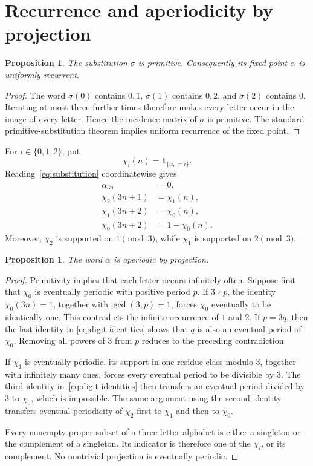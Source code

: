 \documentclass[11pt]{article}
\newtheorem{proposition}[theorem]{Proposition}
\newcommand{\one}{\mathbf 1}
\begin{document}
\section{Recurrence and aperiodicity by projection}\label{sec:dynamics}

\begin{proposition}\label{prop:recurrence}
The substitution $\sigma$ is primitive. Consequently its fixed point
$\alpha$ is uniformly recurrent.
\end{proposition}

\begin{proof}
The word $\sigma(0)$ contains $0,1$, $\sigma(1)$ contains $0,2$, and
$\sigma(2)$ contains $0$. Iterating at most three further times therefore
makes every letter occur in the image of every letter. Hence the incidence
matrix of $\sigma$ is primitive. The standard primitive-substitution theorem
\cite{Queffelec} implies uniform recurrence of the fixed point.
\end{proof}

For $i\in\{0,1,2\}$, put
\[
\chi_i(n)=\one_{\{\alpha_n=i\}}.
\]
Reading~\eqref{eq:substitution} coordinatewise gives
\begin{align}
\alpha_{3n}&=0,\nonumber\\
\chi_2(3n+1)&=\chi_1(n),\nonumber\\
\chi_1(3n+2)&=\chi_0(n),\nonumber\\
\chi_0(3n+2)&=1-\chi_0(n).
\label{eq:digit-identities}
\end{align}
Moreover, $\chi_2$ is supported on $1\pmod3$, while $\chi_1$ is supported on
$2\pmod3$.

\begin{proposition}\label{prop:projection}
The word $\alpha$ is aperiodic by projection.
\end{proposition}

\begin{proof}
Primitivity implies that each letter occurs infinitely often. Suppose first
that $\chi_0$ is eventually periodic with positive period $p$. If $3\nmid p$,
the identity $\chi_0(3n)=1$, together with $\gcd(3,p)=1$, forces $\chi_0$
eventually to be identically one. This contradicts the infinite occurrence of
$1$ and $2$. If $p=3q$, then the last identity in
\eqref{eq:digit-identities} shows that $q$ is also an eventual period of
$\chi_0$. Removing all powers of $3$ from $p$ reduces to the preceding
contradiction.

If $\chi_1$ is eventually periodic, its support in one residue class modulo
$3$, together with infinitely many ones, forces every eventual period to be
divisible by $3$. The third identity in~\eqref{eq:digit-identities} then
transfers an eventual period divided by $3$ to $\chi_0$, which is impossible.
The same argument using the second identity transfers eventual periodicity of
$\chi_2$ first to $\chi_1$ and then to $\chi_0$.

Every nonempty proper subset of a three-letter alphabet is either a singleton
or the complement of a singleton. Its indicator is therefore one of the
$\chi_i$, or its complement. No nontrivial projection is eventually periodic.
\end{proof}
\end{document}
